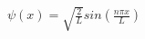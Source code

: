 \documentclass[preview]{standalone}
\begin{document}
\begin{center}
$\psi(x) = \sqrt{\frac{2}{L}}sin(\frac{n\pi x}{L})$
\end{center}
\end{document}

